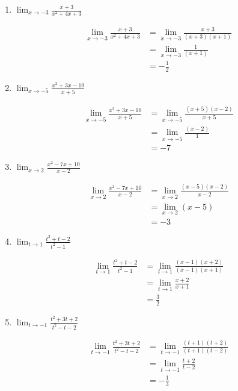 \documentclass[a4paper, 12pt]{article}
\begin{document}
\begin{enumerate}
    \item $\lim_{x \to -3} \frac{x+3}{x^2 + 4x + 3}$
    
    \begin{align*}
        \lim_{x \to -3} \frac{x+3}{x^2 + 4x + 3} &= \lim_{x \to -3} \frac{x+3}{(x+3)(x+1)}\\
        &= \lim_{x \to -3} \frac{1}{(x+1)}\\
        &= -\frac{1}{2}
    \end{align*}

    \item $\lim_{x \to -5} \frac{x^2 + 3x - 10}{x+ 5}$
    
    \begin{align*}
        \lim_{x \to -5} \frac{x^2 + 3x - 10}{x+ 5} &=
        \lim_{x \to -5} \frac{(x+ 5) (x-2)}{x+ 5}\\
        &= \lim_{x \to -5} \frac{(x-2)}{1}\\
        &= -7
    \end{align*}

    \item $\lim_{x \to 2} \frac{x^2 - 7x +10}{x-2}$
    
    \begin{align*}
        \lim_{x \to 2} \frac{x^2 - 7x +10}{x-2} &= \lim_{x \to 2} \frac{(x-5)(x-2)}{x-2}\\
        &= \lim_{x \to 2} (x-5)\\
        &= -3
    \end{align*}

    \item $\lim_{t \to 1} \frac{t^2 + t - 2}{t^2 - 1}$
    
    \begin{align*}
        \lim_{t \to 1} \frac{t^2 + t - 2}{t^2 - 1} &= \lim_{t \to 1} \frac{(x-1) (x+2)}{(x-1)(x+1)}\\
        &= \lim_{t \to 1} \frac{x+2}{x+1}\\
        &= \frac{3}{2}
    \end{align*}

    \item $\lim_{t \to -1} \frac{t^2 + 3t + 2}{t^2 -t -2}$
    
    \begin{align*}
        \lim_{t \to -1} \frac{t^2 + 3t + 2}{t^2 -t -2} &= \lim_{t \to -1} \frac{(t+1)(t+2)}{(t+1)(t-2)}\\
        &= \lim_{t \to -1} \frac{t+2}{t-2}\\
        &= -\frac{1}{3}
    \end{align*}


\end{enumerate}
\end{document}
